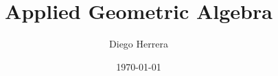 %
\author[D. Herrera]{Diego Herrera}
\title[Applied GA]{Applied Geometric Algebra}
\date{\today}
%
%
\makeatletter
{}
\makeatother
%
\renewcommand{\PrelimWords}
    {Applied GA -- D. Herrera -- Version 1.0.0}
%
